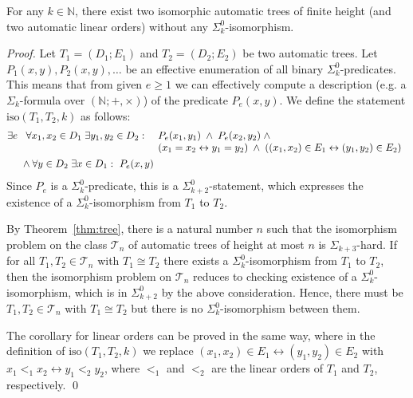 \documentclass[envcountsame]{llncs}
\newcommand{\N}{\mathbb N}
\newcommand{\T}{\mathcal T}
\begin{document}
\begin{corollary}
  For any $k\in \N$, there
  exist two isomorphic automatic trees of finite height (and two automatic
  linear orders) without any $\Sigma^0_k$-isomorphism.
\end{corollary}
\begin{proof} 
Let $T_1=(D_1;E_1)$ and $T_2=(D_2;E_2)$ be two automatic trees.
Let $P_1(x,y), P_2(x,y),\ldots$ be an effective enumeration of all
binary $\Sigma^0_k$-predicates. This means that from given $e \geq 1$ we can 
effectively compute a description (e.g. a $\Sigma_k$-formula over
$(\N;+,\times)$) of the predicate $P_e(x,y)$.
We define the statement $\text{iso}(T_1,T_2,k)$ as follows:
\begin{align*}
\exists e\ &
\begin{array}[t]{ll}
\forall x_1,x_2\in D_1 \; \exists y_1,y_2\in D_2: \ 
  &  P_e(x_1,y_1)
     \; \wedge \; P_e(x_2,y_2) \; \wedge \\
  &   (x_1 = x_2 \leftrightarrow y_1 = y_2) \; \wedge \;
   ((x_1,x_2)\in E_1 \leftrightarrow (y_1,y_2)\in E_2)
 \end{array}\\
&\land\forall y\in D_2 \; \exists x\in D_1: \ 
    P_e(x,y)
\end{align*}
Since $P_e$ is a $\Sigma^0_k$-predicate, this is a
$\Sigma^0_{k+2}$-statement, which expresses the existence of a
$\Sigma_k^0$-isomorphism from $T_1$ to $T_2$.

By Theorem~\ref{thm:tree}, there is a natural number $n$ such that the
isomorphism problem on the class $\T_n$ of automatic trees of height at most
$n$ is $\Sigma_{k+3}$-hard. 
If for all $T_1,T_2\in \T_n$ with $T_1\cong T_2$ there exists 
a $\Sigma^0_k$-isomorphism from $T_1$ to $T_2$, then the isomorphism problem on $\T_n$ reduces to checking
existence of a $\Sigma^0_k$-isomorphism, which is in $\Sigma^0_{k+2}$ by the
above consideration. Hence, there must be $T_1,T_2\in \T_n$ with 
$T_1\cong T_2$ but there is no $\Sigma^0_k$-isomorphism between them. 

The corollary for linear orders can be proved in 
the same way, where in the definition of 
$\text{iso}(T_1,T_2,k)$ we replace $(x_1,x_2)\in E_1 \leftrightarrow (y_1,y_2)\in E_2$ with 
$x_1 <_1 x_2 \leftrightarrow y_1 <_2 y_2$,
where $<_1$ and $<_2$ are the linear orders of $T_1$ and $T_2$, respectively. 
\qed
\end{proof}
\end{document}
